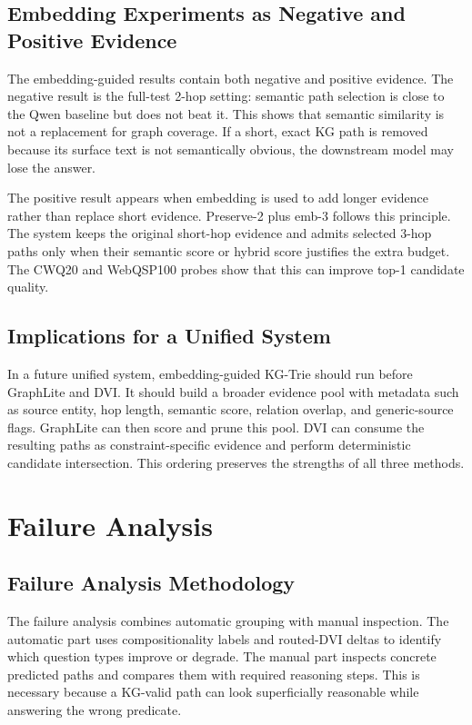\documentclass[10pt,twocolumn]{article}
\begin{document}
\subsection{Embedding Experiments as Negative and Positive Evidence}
The embedding-guided results contain both negative and positive evidence. The negative result is the full-test 2-hop setting: semantic path selection is close to the Qwen baseline but does not beat it. This shows that semantic similarity is not a replacement for graph coverage. If a short, exact KG path is removed because its surface text is not semantically obvious, the downstream model may lose the answer.

The positive result appears when embedding is used to add longer evidence rather than replace short evidence. Preserve-2 plus emb-3 follows this principle. The system keeps the original short-hop evidence and admits selected 3-hop paths only when their semantic score or hybrid score justifies the extra budget. The CWQ20 and WebQSP100 probes show that this can improve top-1 candidate quality.

\subsection{Implications for a Unified System}
In a future unified system, embedding-guided KG-Trie should run before GraphLite and DVI. It should build a broader evidence pool with metadata such as source entity, hop length, semantic score, relation overlap, and generic-source flags. GraphLite can then score and prune this pool. DVI can consume the resulting paths as constraint-specific evidence and perform deterministic candidate intersection. This ordering preserves the strengths of all three methods.

\section{Failure Analysis}

\subsection{Failure Analysis Methodology}
The failure analysis combines automatic grouping with manual inspection. The automatic part uses compositionality labels and routed-DVI deltas to identify which question types improve or degrade. The manual part inspects concrete predicted paths and compares them with required reasoning steps. This is necessary because a KG-valid path can look superficially reasonable while answering the wrong predicate.
\end{document}
